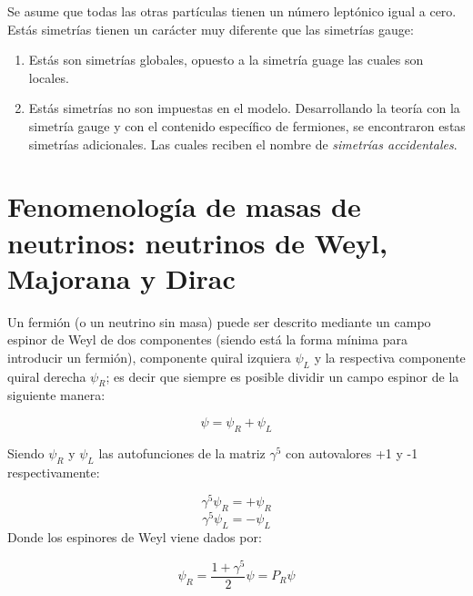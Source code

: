 \documentclass[12pt]{article}
\begin{document}
Se asume que todas las otras partículas tienen un número leptónico igual a cero. \\ 

Estás simetrías tienen un carácter muy diferente que las simetrías gauge: 
\begin{enumerate}
\item Estás son simetrías globales, opuesto a la simetría guage las cuales son locales. 

\item Estás simetrías no son impuestas en el modelo. Desarrollando la teoría con la simetría gauge y con el contenido específico de fermiones, se encontraron estas simetrías adicionales. Las cuales reciben el nombre de \textit{simetrías accidentales}. 

\end{enumerate}




\section{Fenomenología de masas de neutrinos: neutrinos de Weyl, Majorana y Dirac }

Un fermión (o un neutrino sin masa) puede ser descrito mediante un campo espinor de Weyl de dos componentes (siendo está la forma mínima para introducir un fermión), componente quiral izquiera \(\psi_L\) y la respectiva componente quiral derecha \(\psi_R\); es decir que siempre es posible dividir un campo espinor de la siguiente manera:

\begin{equation}
\psi= \psi_R+ \psi_L
\label{eq:2'}
\end{equation}   

Siendo \(\psi_R\) y \(\psi_L\)  las autofunciones de la matriz \(\gamma^{5}\) con autovalores +1 y -1 respectivamente:

\begin{equation}
\gamma^{5}\psi_R= + \psi_R
\end{equation} 
\begin{equation}
\gamma^{5}\psi_L= - \psi_L
\end{equation} 
Donde los espinores de Weyl viene dados por: 

\begin{equation}
\psi_R= \frac{1+\gamma^{5}}{2}\psi=P_R\psi
\label{eq:2*}
\end{equation} 
\end{document}

